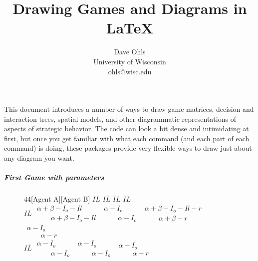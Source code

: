 \documentclass[10.5pt]{article}
\title{Drawing Games and Diagrams in \LaTeX}
\author{Dave Ohls \\ University of Wisconsin \\ ohls@wisc.edu}
\date{}
\begin{document}
\maketitle

This document introduces a number of ways to draw game matrices, decision and interaction trees, spatial models, and other diagrammatic representations of aspects of strategic behavior.  The code can look a bit dense and intimidating at first, but once you get familiar with what each command (and each part of each command) is doing, these packages provide very flexible ways to draw just about any diagram you want.   \\
\subparagraph{First Game with parameters}
\begin{figure}[ h!]
\begin{center} 
\begin{footnotesize}
\begin{game}{4}{4}[Agent A][Agent B]
       						 \> $IL$  	\> $I\overline{L}$ 	\> $\overline{I}L$  \> $\overline{I}\overline{L}$   \\
$IL$     					 \> $\begin{array}{l}\alpha+\beta-I_{o}-I{l} \\[0.0mm]\phantom{--}\alpha+\beta-I_{o}-I{l} \end{array}$
							 \> $\begin{array}{l}\alpha-I_{o} \\[0.0mm]\phantom{--}\alpha-I_{o} \end{array}$
							 \> $\begin{array}{l}\alpha+\beta-I_{o}-I{l}-r \\[0.0mm]\phantom{--}\alpha+\beta-r \end{array}$
							 \> $\begin{array}{l}\alpha-I_{o} \\[0.0mm]\phantom{--}\alpha-r \end{array}$
							 \\$I\overline{L}$
							  \> $\begin{array}{l}\alpha-I_{o} \\[0.0mm]\phantom{--}\alpha-I_{o} \end{array}$
							  \> $\begin{array}{l}\alpha-I_{o} \\[0.0mm]\phantom{--}\alpha-I_{o} \end{array}$
							  \> $\begin{array}{l}\alpha-I_{o} \\[0.0mm]\phantom{--}\alpha-r \end{array}$

\end{game}
\end{footnotesize}
\end{center}
\end{figure}
\end{document}
